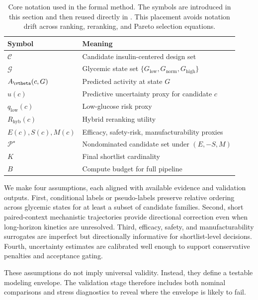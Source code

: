 \documentclass{article} %
\begin{document}
\begin{table}[t]
\caption{Core notation used in the formal method. The symbols are introduced in this section and then reused directly in . This placement avoids notation drift across ranking, reranking, and Pareto selection equations.}
\label{tab:notation}
\centering
\small
\renewcommand{\arraystretch}{1.1}
\setlength{\tabcolsep}{4pt}
\begin{tabular}{ll}
\hline
Symbol & Meaning \\
\hline
$\mathcal{C}$ & Candidate insulin-centered design set \\
$\mathcal{G}$ & Glycemic state set $\{G_{\mathrm{low}},G_{\mathrm{norm}},G_{\mathrm{high}}\}$ \\
$A_{\vtheta}(c,G)$ & Predicted activity at state $G$ \\
$u(c)$ & Predictive uncertainty proxy for candidate $c$ \\
$q_{\mathrm{low}}(c)$ & Low-glucose risk proxy \\
$R_{\mathrm{hyb}}(c)$ & Hybrid reranking utility \\
$E(c),S(c),M(c)$ & Efficacy, safety-risk, manufacturability proxies \\
$\mathcal{P}^{\star}$ & Nondominated candidate set under $(E,-S,M)$ \\
$K$ & Final shortlist cardinality \\
$B$ & Compute budget for full pipeline \\
\hline
\end{tabular}
\end{table}

We make four assumptions, each aligned with available evidence and validation outputs. First, conditional labels or pseudo-labels preserve relative ordering across glycemic states for at least a subset of candidate families. Second, short paired-context mechanistic trajectories provide directional correction even when long-horizon kinetics are unresolved. Third, efficacy, safety, and manufacturability surrogates are imperfect but directionally informative for shortlist-level decisions. Fourth, uncertainty estimates are calibrated well enough to support conservative penalties and acceptance gating.

These assumptions do not imply universal validity. Instead, they define a testable modeling envelope. The validation stage therefore includes both nominal comparisons and stress diagnostics to reveal where the envelope is likely to fail.
\end{document}
